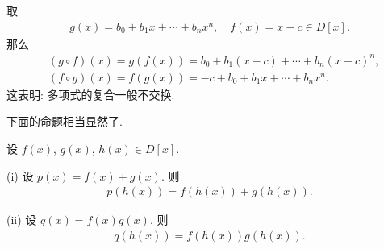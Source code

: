 \begin{example}
    取
    \begin{align*}
        g(x) = b_0 + b_1 x + \cdots + b_n x^n, \quad f(x) = x - c \in D[x].
    \end{align*}
    那么
    \begin{align*}
         & (g \circ f) (x) = g(f(x)) = b_0 + b_1 (x-c) + \cdots + b_n (x-c)^n, \\
         & (f \circ g) (x) = f(g(x)) = -c + b_0 + b_1 x + \cdots + b_n x^n.
    \end{align*}
    这表明: 多项式的复合一般不交换.
\end{example}

下面的命题相当显然了.

\begin{proposition}
    设 $f(x)$, $g(x)$, $h(x) \in D[x]$.

    (i) 设 $p(x) = f(x) + g(x)$. 则
    \begin{align*}
        p(h(x)) = f(h(x)) + g(h(x)).
    \end{align*}

    (ii) 设 $q(x) = f(x) g(x)$. 则
    \begin{align*}
        q(h(x)) = f(h(x)) g(h(x)).
    \end{align*}
\end{proposition}


